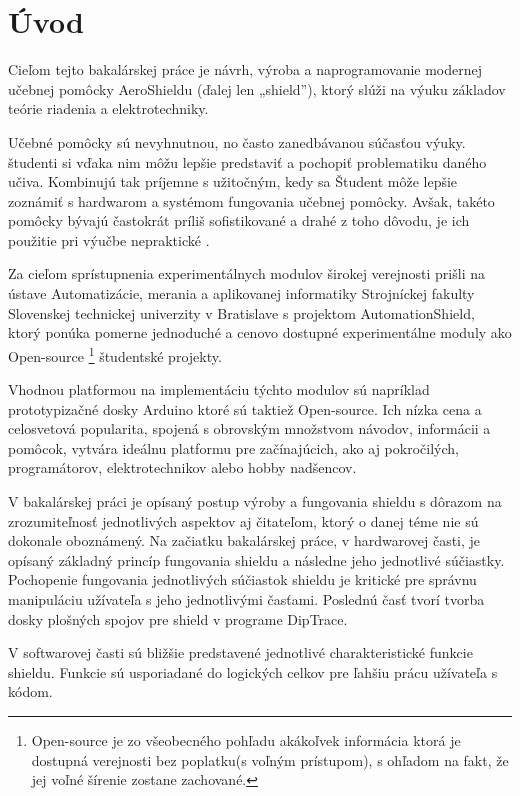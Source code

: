 \chapter*{Úvod}
\label{UVOD}


Cieľom tejto bakalárskej práce je návrh, výroba a naprogramovanie modernej učebnej pomôcky AeroShieldu (ďalej len „shield”), ktorý slúži na výuku základov teórie riadenia a elektrotechniky.

Učebné pomôcky sú nevyhnutnou, no často zanedbávanou súčasťou výuky. študenti si vďaka nim môžu lepšie predstaviť a pochopiť problematiku daného učiva. Kombinujú tak príjemne s užitočným, kedy sa Študent môže lepšie zoznámiť s hardwarom a systémom fungovania učebnej pomôcky.
Avšak, takéto pomôcky bývajú častokrát príliš sofistikované a drahé \cite{Hor} z toho dôvodu, je ich použitie pri výučbe nepraktické .

Za cieľom sprístupnenia experimentálnych modulov širokej verejnosti prišli na ústave Automatizácie, merania a aplikovanej informatiky
Strojníckej fakulty Slovenskej technickej univerzity v Bratislave s projektom AutomationShield, ktorý ponúka pomerne jednoduché a cenovo dostupné experimentálne moduly ako Open-source \footnote[1]{Open-source je zo všeobecného pohľadu akákoľvek informácia ktorá je dostupná verejnosti bez poplatku(s voľným prístupom), s ohľadom na fakt, že jej voľné šírenie zostane zachované.} študentské projekty.

Vhodnou platformou na implementáciu týchto modulov sú napríklad prototypizačné dosky Arduino ktoré sú taktiež Open-source. Ich nízka cena a celosvetová popularita, spojená s obrovským množstvom návodov, informácii a pomôcok, vytvára ideálnu platformu pre začínajúcich, ako aj pokročilých, programátorov, elektrotechnikov alebo hobby nadšencov.

V bakalárskej práci je opísaný postup výroby a fungovania shieldu s dôrazom na zrozumiteľnosť jednotlivých aspektov aj čitateľom, ktorý o danej téme nie sú dokonale oboznámený. Na začiatku bakalárskej práce, v hardwarovej časti, je opísaný základný princíp fungovania shieldu a následne jeho jednotlivé súčiastky. Pochopenie fungovania jednotlivých súčiastok shieldu je kritické pre správnu manipuláciu užívateľa s jeho jednotlivými časťami. Poslednú časť tvorí tvorba dosky plošných spojov pre shield v programe DipTrace.

V softwarovej časti sú bližšie predstavené jednotlivé charakteristické funkcie shieldu. Funkcie sú usporiadané do logických celkov pre ľahšiu prácu užívateľa s kódom.

